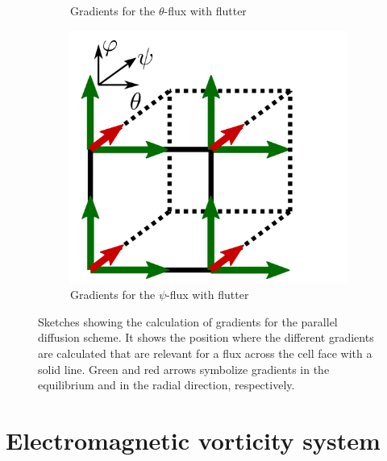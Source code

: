 \begin{figure}[!h]
\begin{subfigure}[t]{0.32\textwidth}
		\caption{ Gradients for the $\theta$-flux with flutter}
		\label{fig:Gunter3D_theta} 
	\end{subfigure}
	\begin{subfigure}[t]{0.32\textwidth}
		\centering
		\includegraphics[width=\textwidth]{schemes/Gunter3D_psi.png}
		\caption{ Gradients for the $\psi$-flux with flutter}
		\label{fig:GunterD_psi}
	\end{subfigure}
	\caption{Sketches showing the calculation of gradients for the parallel diffusion scheme. It shows the position where the different gradients are calculated that are relevant for a flux across the cell face with a solid line. Green and red arrows symbolize gradients in the equilibrium and in the radial direction, respectively.}
	\label{fig:GunterStencils_flutter}
\end{figure}






\section{Electromagnetic vorticity system}

